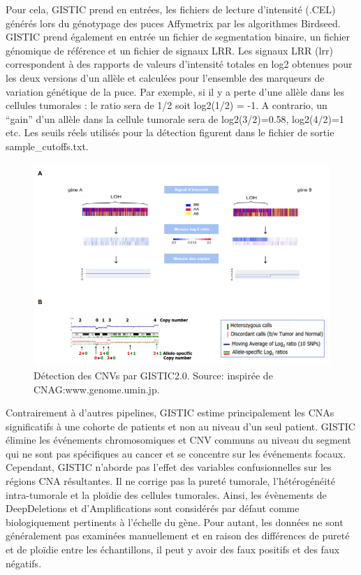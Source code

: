 \documentclass{style}
\begin{document}
Pour cela, GISTIC prend en entrées, les fichiers de lecture d'intensité (.CEL) générés lors du génotypage des puces Affymetrix par les algorithmes Birdseed. GISTIC prend également en entrée un fichier de segmentation binaire, un fichier génomique de référence et un fichier de signaux LRR. Les signaux LRR (\acrlong{lrr}) correspondent à des rapports de valeurs d'intensité totales en log2 obtenues pour les deux versions d’un allèle et calculées pour l’ensemble des marqueurs de variation génétique de la puce. Par exemple, si il y a perte d’une allèle dans les cellules tumorales : le ratio sera de 1/2 soit log2(1/2) = -1. A contrario, un “gain” d’un allèle dans la cellule tumorale sera de log2(3/2)=0.58, log2(4/2)=1 etc.  Les seuils réels utilisés pour la détection figurent dans le fichier de sortie sample\_cutoffs.txt.
\begin{figure}[H]
  \centering
  \includegraphics[width=16cm]{images/figures/CNV.png}
  \caption[Détection des CNVs par GISTIC2.0.]{Détection des CNVs par GISTIC2.0. Source: inspirée de CNAG:www.genome.umin.jp.}
  \label{fig:CVN}
\end{figure}
Contrairement à d’autres pipelines, GISTIC estime principalement les CNAs significatifs à une cohorte de patients et non au niveau d'un seul patient. GISTIC élimine les événements chromosomiques et CNV communs au niveau du segment qui ne sont pas spécifiques au cancer et se concentre sur les événements focaux. Cependant, GISTIC n'aborde pas l'effet des variables confusionnelles sur les régions CNA résultantes. Il ne corrige pas la pureté tumorale, l'hétérogénéité intra-tumorale et la ploïdie des cellules tumorales. Ainsi, les évènements de DeepDeletions et d’Amplifications sont considérés par défaut comme biologiquement pertinents à l’échelle du gène. Pour autant, les données ne sont généralement pas examinées manuellement et en raison des différences de pureté et de ploïdie entre les échantillons, il peut y avoir des faux positifs et des faux négatifs.
\end{document}
